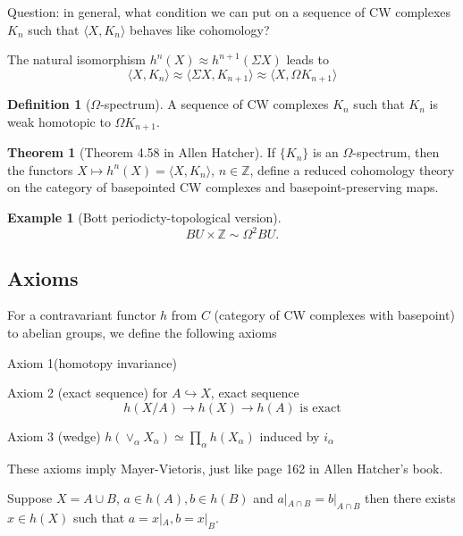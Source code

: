 \documentclass[11pt, oneside]{article}   	%
\theoremstyle{definition}
\newtheorem*{defn}{Definition}
\newtheorem*{eg}{Example}
\newtheorem*{thm}{Theorem}
\begin{document}
Question: in general, what condition we can put on a sequence of CW complexes $K_n$ such that $\langle X, K_n\rangle$ behaves like cohomology?

The natural isomorphism $h^n(X)\approx h^{n+1}(\Sigma X)$ leads to
\begin{equation}
	\langle X, K_n\rangle \approx \langle \Sigma X, K_{n+1}\rangle\approx \langle X, \Omega K_{n+1}\rangle
\end{equation}

\begin{defn}[$\Omega$-spectrum]
	A sequence of CW complexes $K_n$ such that
	$K_n$ is weak homotopic to $\Omega K_{n+1}$.
\end{defn}

\begin{thm}
[Theorem 4.58 in Allen Hatcher] If $\{K_n\}$ is an $\Omega$-spectrum, then the functors $X\mapsto h^n(X)=\langle X, K_n\rangle$, $n\in \mathbb{Z}$, define a reduced cohomology theory on the category of basepointed CW complexes and basepoint-preserving maps.
\end{thm}

\begin{eg}
	[Bott periodicty-topological version]
	\begin{equation}
		BU\times \mathbb{Z}\sim \Omega^2 BU.
	\end{equation}
\end{eg}

\subsection{Axioms}

For a contravariant functor $h$ from $C$ (category of CW complexes with basepoint) to abelian groups, we define the following axioms

Axiom 1(homotopy invariance)

Axiom 2 (exact sequence)
for $A\hookrightarrow X$, exact sequence
		\begin{equation}
			h(X/A)\to h(X)\to h(A)\text{ is exact}
		\end{equation}

Axiom 3 (wedge) $h(\vee_\alpha X_\alpha)\simeq \prod_\alpha h(X_\alpha)$ induced by $i_\alpha$

\begin{rmk}
	These axioms imply Mayer-Vietoris, just like page 162 in Allen Hatcher's book.

	Suppose $X=A\cup B$, $a\in h(A), b\in h(B)$ and $a|_{A\cap B}=b|_{A\cap B}$ then there exists $x\in h(X)$ such that $a=x|_A,b=x|_B$.
\end{rmk}
\end{document}
